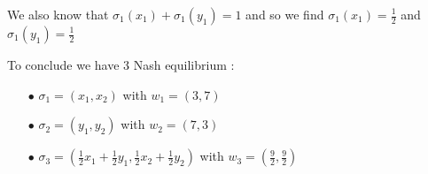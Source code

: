 We also know that $\sigma_1(x_1) + \sigma_1(y_1) = 1$ and so we find $\sigma_1(x_1)=\frac{1}{2}$ and $\sigma_1(y_1)=\frac{1}{2}$

To conclude we have 3 Nash equilibrium :
\begin{itemize}
  \item[$\bullet$]  $\sigma_1 = \left(x_1,x_2\right)$ with $w_1= \left(3,7\right)$
  \item[$\bullet$]  $\sigma_2 = \left(y_1,y_2\right)$ with $w_2= \left(7,3\right)$
  \item[$\bullet$]  $\sigma_3 = \left( \frac{1}{2}x_1 + \frac{1}{2}y_1, \frac{1}{2}x_2 + \frac{1}{2}y_2\right)$ with $w_3= \left(\frac{9}{2},\frac{9}{2}\right)$
\end{itemize}
